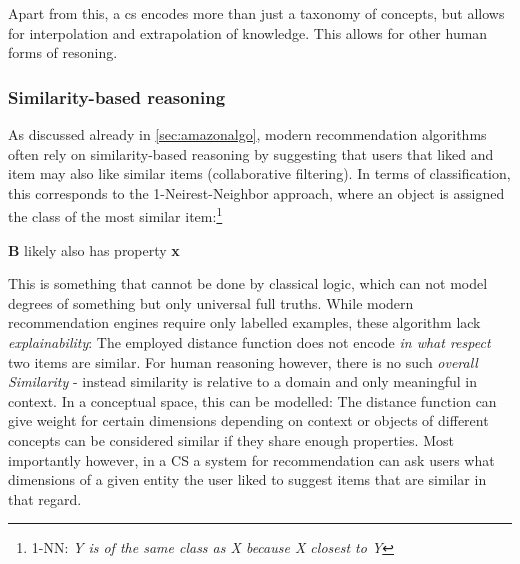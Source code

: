 Apart from this, a \gls{cs} encodes more than just a taxonomy of concepts, but allows for interpolation and extrapolation of knowledge. This allows for other human forms of resoning.

\subsubsection*{Similarity-based reasoning}

\label{sec:similaritybasedreasoning}

As discussed already in \autoref{sec:amazonalgo}, modern recommendation algorithms often rely on similarity-based reasoning by suggesting that users that liked and item may also like similar items (collaborative filtering). In terms of classification, this corresponds to the 1-Neirest-Neighbor approach, where an object is assigned the class of the most similar item:\footnote{1-NN: \textit{Y is of the same class as X because X closest to Y}}

\noindent
\begin{minipage}{.6\textwidth}
\end{minipage}%
\begin{minipage}{.4\textwidth}
             {\textbf{B} likely also has property \textbf{x}}
\end{minipage}%

\vspace{2ex}

This is something that cannot be done by classical logic, which can not model degrees of something but only universal full truths. While modern recommendation engines require only labelled examples, these algorithm lack \textit{explainability}: The employed distance function does not encode \textit{in what respect} two items are similar. For human reasoning however, there is no such \textit{overall Similarity} - instead similarity is relative to a domain and only meaningful in context\cite[110]{Gardenfors2000a}. In a conceptual space, this can be modelled: The distance function can give weight for certain dimensions depending on context or objects of different concepts can be considered similar if they share enough properties. Most importantly however, in a CS a system for recommendation can ask users what dimensions of a given entity the user liked to suggest items that are similar in that regard.

